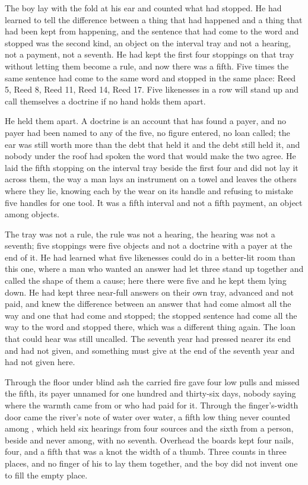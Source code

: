 \scenebreak

The boy lay with the fold at his ear and counted what had stopped. He had learned to tell the difference between a thing that had happened and a thing that had been kept from happening, and the sentence that had come to the word and stopped was the second kind, an object on the interval tray and not a hearing, not a payment, not a seventh. He had kept the first four stoppings on that tray without letting them become a rule, and now there was a fifth. Five times the same sentence had come to the same word and stopped in the same place: Reed 5, Reed 8, Reed 11, Reed 14, Reed 17. Five likenesses in a row will stand up and call themselves a doctrine if no hand holds them apart.

He held them apart. A doctrine is an account that has found a payer, and no payer had been named to any of the five, no figure entered, no loan called; the ear was still worth more than the debt that held it and the debt still held it, and nobody under the roof had spoken the word that would make the two agree. He laid the fifth stopping on the interval tray beside the first four and did not lay it across them, the way a man lays an instrument on a towel and leaves the others where they lie, knowing each by the wear on its handle and refusing to mistake five handles for one tool. It was a fifth interval and not a fifth payment, an object among objects.

The tray was not a rule, the rule was not a hearing, the hearing was not a seventh; five stoppings were five objects and not a doctrine with a payer at the end of it. He had learned what five likenesses could do in a better-lit room than this one, where a man who wanted an answer had let three stand up together and called the shape of them a cause; here there were five and he kept them lying down. He had kept three near-full answers on their own tray, advanced and not paid, and knew the difference between an answer that had come almost all the way and one that had come and stopped; the stopped sentence had come all the way to the word and stopped there, which was a different thing again. The loan that could hear was still uncalled. The seventh year had pressed nearer its end and had not given, and something must give at the end of the seventh year and had not given here.

Through the floor under blind ash the carried fire gave four low pulls and missed the fifth, its payer unnamed for one hundred and thirty-six days, nobody saying where the warmth came from or who had paid for it. Through the finger's-width door came the river's note of water over water, a fifth low thing never counted among , which held six hearings from four sources and the sixth from a person, beside and never among, with no seventh. Overhead the boards kept four nails, four, and a fifth that was a knot the width of a thumb. Three counts in three places, and no finger of his to lay them together, and the boy did not invent one to fill the empty place.

